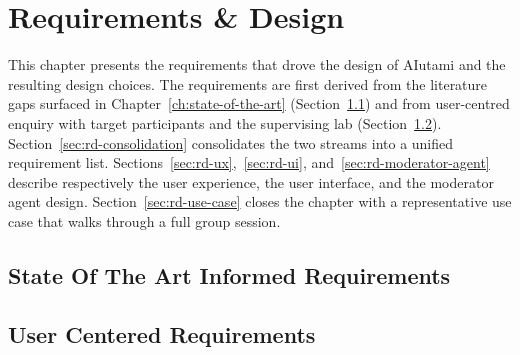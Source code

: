 \chapter{Requirements \& Design}
\label{ch:requirements-design}


This chapter presents the requirements that drove the design of AIutami
and the resulting design choices. The requirements are first derived
from the literature gaps surfaced in Chapter~\ref{ch:state-of-the-art}
(Section~\ref{sec:rd-sota-req}) and from user-centred enquiry with
target participants and the supervising lab
(Section~\ref{sec:rd-user-req}). Section~\ref{sec:rd-consolidation}
consolidates the two streams into a unified requirement list.
Sections~\ref{sec:rd-ux},~\ref{sec:rd-ui},
and~\ref{sec:rd-moderator-agent} describe respectively the user
experience, the user interface, and the moderator agent design.
Section~\ref{sec:rd-use-case} closes the chapter with a representative
use case that walks through a full group session.

\section{State Of The Art Informed Requirements}
\label{sec:rd-sota-req}

\section{User Centered Requirements}
\label{sec:rd-user-req}

